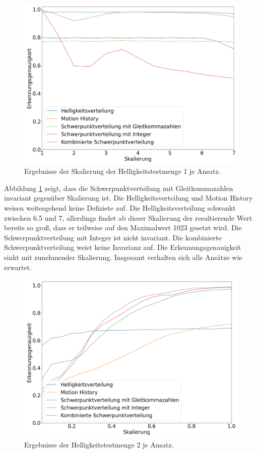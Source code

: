 \begin{figure}[h!]
    \centering
    \includegraphics[width=\linewidth]{images/brightness_scaling.png}
    \caption{Ergebnisse der Skalierung der Helligkeitstestmenge 1 je Ansatz.}
    \label{fig:brightness_scaling}
\end{figure}
\newline
\newline
Abbildung \ref{fig:brightness_scaling} zeigt, dass die Schwerpunktverteilung mit Gleitkommazahlen invariant gegenüber Skalierung ist. Die Helligkeitsverteilung und Motion History weisen weitesgehend
keine Defiziete auf. Die Helligkeitsverteilung schwankt zwischen 6.5 und 7, allerdings findet ab dieser Skalierung der resultierende Wert bereits so groß, dass er teilweise auf den Maximalwert 1023
gesetzt wird. Die Schwerpunktverteilung mit Integer ist nicht invariant. Die kombinierte Schwerpunktverteilung weist keine Invarianz auf. Die Erkennungsgenauigkeit sinkt mit zunehmender Skalierung.
Insgesamt verhalten sich alle Ansätze wie erwartet.
\begin{figure}[h!]
    \centering
    \includegraphics[width=\linewidth]{images/brightness2_scaling.png}
    \caption{Ergebnisse der Helligkeitstestmenge 2 je Ansatz.}
    \label{fig:brightness2_scaling}
\end{figure}
